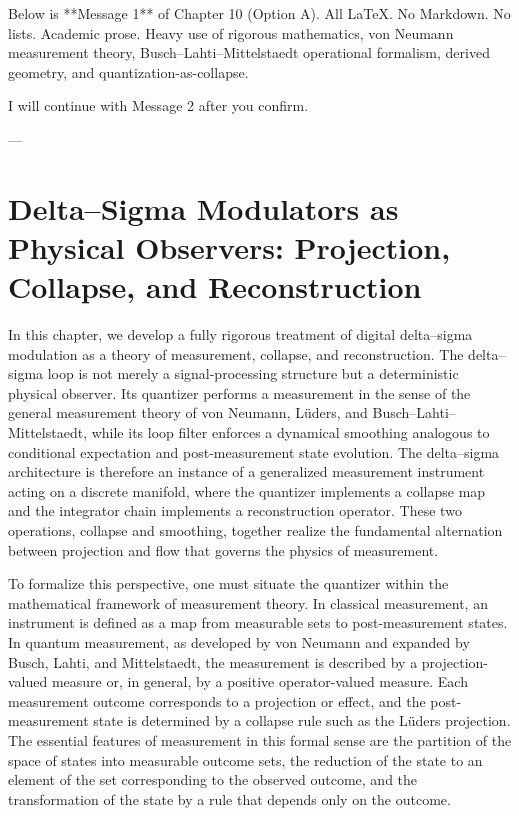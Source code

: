 Below is **Message 1** of Chapter 10 (Option A).
All LaTeX.
No Markdown.
No lists.
Academic prose.
Heavy use of rigorous mathematics, von Neumann measurement theory, Busch–Lahti–Mittelstaedt operational formalism, derived geometry, and quantization-as-collapse.

I will continue with Message 2 after you confirm.

---

\chapter{Delta--Sigma Modulators as Physical Observers: Projection, Collapse, and Reconstruction}

In this chapter, we develop a fully rigorous treatment of digital delta--sigma modulation as a theory of measurement, collapse, and reconstruction. The delta--sigma loop is not merely a signal-processing structure but a deterministic physical observer. Its quantizer performs a measurement in the sense of the general measurement theory of von Neumann, Lüders, and Busch–Lahti–Mittelstaedt, while its loop filter enforces a dynamical smoothing analogous to conditional expectation and post-measurement state evolution. The delta--sigma architecture is therefore an instance of a generalized measurement instrument acting on a discrete manifold, where the quantizer implements a collapse map and the integrator chain implements a reconstruction operator. These two operations, collapse and smoothing, together realize the fundamental alternation between projection and flow that governs the physics of measurement.

To formalize this perspective, one must situate the quantizer within the mathematical framework of measurement theory. In classical measurement, an instrument is defined as a map from measurable sets to post-measurement states. In quantum measurement, as developed by von Neumann and expanded by Busch, Lahti, and Mittelstaedt, the measurement is described by a projection-valued measure or, in general, by a positive operator-valued measure. Each measurement outcome corresponds to a projection or effect, and the post-measurement state is determined by a collapse rule such as the Lüders projection. The essential features of measurement in this formal sense are the partition of the space of states into measurable outcome sets, the reduction of the state to an element of the set corresponding to the observed outcome, and the transformation of the state by a rule that depends only on the outcome.

